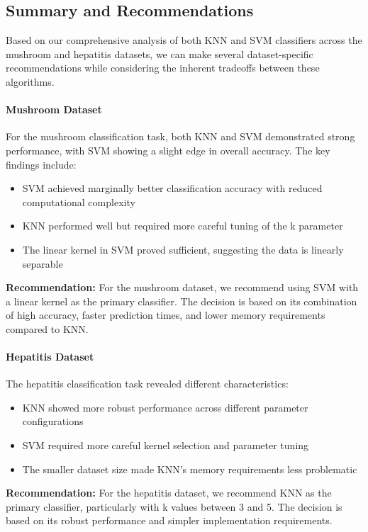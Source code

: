 \subsection{Summary and Recommendations}

Based on our comprehensive analysis of both KNN and SVM classifiers across the mushroom and hepatitis datasets, we can make several dataset-specific recommendations while considering the inherent tradeoffs between these algorithms.

\paragraph{Mushroom Dataset}
For the mushroom classification task, both KNN and SVM demonstrated strong performance, with SVM showing a slight edge in overall accuracy. The key findings include:

\begin{itemize}
    \item SVM achieved marginally better classification accuracy with reduced computational complexity
    \item KNN performed well but required more careful tuning of the k parameter
    \item The linear kernel in SVM proved sufficient, suggesting the data is linearly separable
\end{itemize}

\textbf{Recommendation:} For the mushroom dataset, we recommend using SVM with a linear kernel as the primary classifier. The decision is based on its combination of high accuracy, faster prediction times, and lower memory requirements compared to KNN.

\paragraph{Hepatitis Dataset}
The hepatitis classification task revealed different characteristics:

\begin{itemize}
    \item KNN showed more robust performance across different parameter configurations
    \item SVM required more careful kernel selection and parameter tuning
    \item The smaller dataset size made KNN's memory requirements less problematic
\end{itemize}

\textbf{Recommendation:} For the hepatitis dataset, we recommend KNN as the primary classifier, particularly with k values between 3 and 5. The decision is based on its robust performance and simpler implementation requirements.

